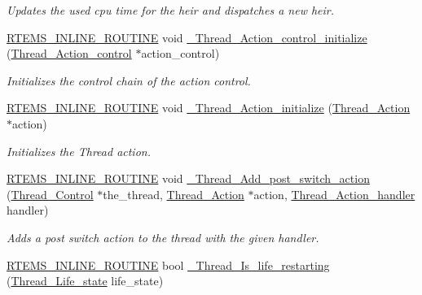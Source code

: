 \begin{DoxyCompactItemize}
\begin{DoxyCompactList}\small\item\em Updates the used cpu time for the heir and dispatches a new heir. \end{DoxyCompactList}\item 
\mbox{\hyperlink{group__RTEMSScoreBaseDefs_gac216239df231d5dbd15e3520b0b9313f}{R\+T\+E\+M\+S\+\_\+\+I\+N\+L\+I\+N\+E\+\_\+\+R\+O\+U\+T\+I\+NE}} void \mbox{\hyperlink{group__RTEMSScoreThread_ga6c6a5ea33a2380faf75952592f7ff8f0}{\+\_\+\+Thread\+\_\+\+Action\+\_\+control\+\_\+initialize}} (\mbox{\hyperlink{structThread__Action__control}{Thread\+\_\+\+Action\+\_\+control}} $\ast$action\+\_\+control)
\begin{DoxyCompactList}\small\item\em Initializes the control chain of the action control. \end{DoxyCompactList}\item 
\mbox{\hyperlink{group__RTEMSScoreBaseDefs_gac216239df231d5dbd15e3520b0b9313f}{R\+T\+E\+M\+S\+\_\+\+I\+N\+L\+I\+N\+E\+\_\+\+R\+O\+U\+T\+I\+NE}} void \mbox{\hyperlink{group__RTEMSScoreThread_gaaae54223afb793365b74ff959e0d2369}{\+\_\+\+Thread\+\_\+\+Action\+\_\+initialize}} (\mbox{\hyperlink{structThread__Action}{Thread\+\_\+\+Action}} $\ast$action)
\begin{DoxyCompactList}\small\item\em Initializes the Thread action. \end{DoxyCompactList}\item 
\mbox{\hyperlink{group__RTEMSScoreBaseDefs_gac216239df231d5dbd15e3520b0b9313f}{R\+T\+E\+M\+S\+\_\+\+I\+N\+L\+I\+N\+E\+\_\+\+R\+O\+U\+T\+I\+NE}} void \mbox{\hyperlink{group__RTEMSScoreThread_gab19f3f385804128f7f975c8ed326765a}{\+\_\+\+Thread\+\_\+\+Add\+\_\+post\+\_\+switch\+\_\+action}} (\mbox{\hyperlink{struct__Thread__Control}{Thread\+\_\+\+Control}} $\ast$the\+\_\+thread, \mbox{\hyperlink{structThread__Action}{Thread\+\_\+\+Action}} $\ast$action, \mbox{\hyperlink{group__RTEMSScoreThread_ga3ed91c6271fd8090120d824662541c74}{Thread\+\_\+\+Action\+\_\+handler}} handler)
\begin{DoxyCompactList}\small\item\em Adds a post switch action to the thread with the given handler. \end{DoxyCompactList}\item 
\mbox{\hyperlink{group__RTEMSScoreBaseDefs_gac216239df231d5dbd15e3520b0b9313f}{R\+T\+E\+M\+S\+\_\+\+I\+N\+L\+I\+N\+E\+\_\+\+R\+O\+U\+T\+I\+NE}} bool \mbox{\hyperlink{group__RTEMSScoreThread_ga02d81e4074320decb23de6713559e215}{\+\_\+\+Thread\+\_\+\+Is\+\_\+life\+\_\+restarting}} (\mbox{\hyperlink{group__RTEMSScoreThread_ga0b4c61e432a0c21855e3122bb394583d}{Thread\+\_\+\+Life\+\_\+state}} life\+\_\+state)

\end{DoxyCompactItemize}
